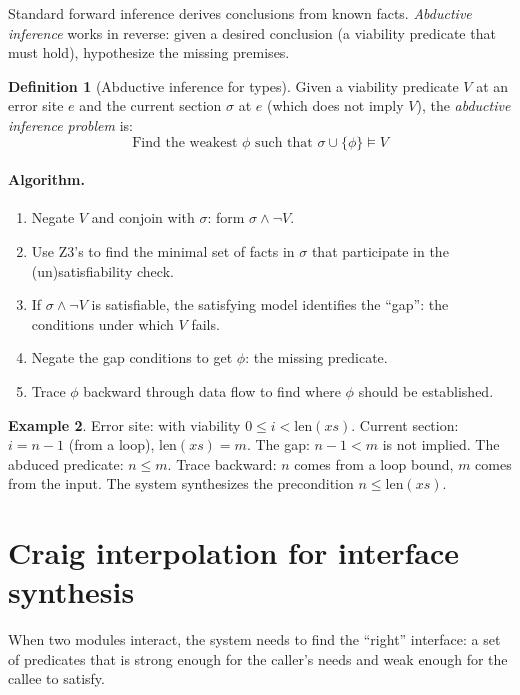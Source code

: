 \documentclass[11pt]{report}
\DeclareRobustCommand{\py}[1]{\texttt{\detokenize{#1}}}
\theoremstyle{definition}
\newtheorem{definition}{Definition}[section]
\newtheorem{example}[definition]{Example}
\theoremstyle{plain}
\begin{document}
Standard forward inference derives conclusions from known facts. \emph{Abductive
inference} works in reverse: given a desired conclusion (a viability predicate
that must hold), hypothesize the missing premises.

\begin{definition}[Abductive inference for types]
Given a viability predicate $V$ at an error site $e$ and the current section
$\sigma$ at $e$ (which does not imply $V$), the \emph{abductive inference
problem} is:
\[
  \text{Find the weakest } \phi \text{ such that }
    \sigma \cup \{\phi\} \models V
\]
\end{definition}

\paragraph{Algorithm.}
\begin{enumerate}[nosep]
  \item Negate $V$ and conjoin with $\sigma$: form $\sigma \wedge \neg V$.
  \item Use Z3's \py{unsat_core()} to find the minimal set of facts in
        $\sigma$ that participate in the (un)satisfiability check.
  \item If $\sigma \wedge \neg V$ is satisfiable, the satisfying model
        identifies the ``gap'': the conditions under which $V$ fails.
  \item Negate the gap conditions to get $\phi$: the missing predicate.
  \item Trace $\phi$ backward through data flow to find where $\phi$
        should be established.
\end{enumerate}

\begin{example}
Error site: \py{xs[i]} with viability $0 \leq i < \mathrm{len}(xs)$.
Current section: $i = n - 1$ (from a loop), $\mathrm{len}(xs) = m$.
The gap: $n - 1 < m$ is not implied. The abduced predicate: $n \leq m$.
Trace backward: $n$ comes from a loop bound, $m$ comes from the input.
The system synthesizes the precondition $n \leq \mathrm{len}(xs)$.
\end{example}

\section{Craig interpolation for interface synthesis}

When two modules interact, the system needs to find the ``right'' interface:
a set of predicates that is strong enough for the caller's needs and weak
enough for the callee to satisfy.
\end{document}

